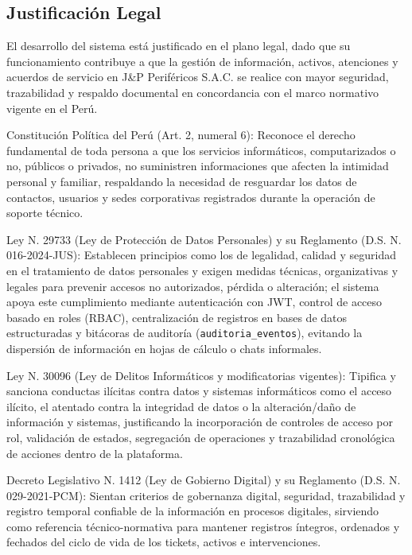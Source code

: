 \subsection{Justificación Legal}

El desarrollo del sistema está justificado en el plano legal, dado que su funcionamiento contribuye a que la gestión de información, activos, atenciones y acuerdos de servicio en J\&P Periféricos S.A.C. se realice con mayor seguridad, trazabilidad y respaldo documental en concordancia con el marco normativo vigente en el Perú.

Constitución Política del Perú (Art. 2, numeral 6): Reconoce el derecho fundamental de toda persona a que los servicios informáticos, computarizados o no, públicos o privados, no suministren informaciones que afecten la intimidad personal y familiar, respaldando la necesidad de resguardar los datos de contactos, usuarios y sedes corporativas registrados durante la operación de soporte técnico.

Ley N.\textdegree{} 29733 (Ley de Protección de Datos Personales) y su Reglamento (D.S. N.\textdegree{} 016-2024-JUS): Establecen principios como los de legalidad, calidad y seguridad en el tratamiento de datos personales y exigen medidas técnicas, organizativas y legales para prevenir accesos no autorizados, pérdida o alteración; el sistema apoya este cumplimiento mediante autenticación con JWT, control de acceso basado en roles (RBAC), centralización de registros en bases de datos estructuradas y bitácoras de auditoría (\texttt{auditoria\_eventos}), evitando la dispersión de información en hojas de cálculo o chats informales.

Ley N.\textdegree{} 30096 (Ley de Delitos Informáticos y modificatorias vigentes): Tipifica y sanciona conductas ilícitas contra datos y sistemas informáticos como el acceso ilícito, el atentado contra la integridad de datos o la alteración/daño de información y sistemas, justificando la incorporación de controles de acceso por rol, validación de estados, segregación de operaciones y trazabilidad cronológica de acciones dentro de la plataforma.

Decreto Legislativo N.\textdegree{} 1412 (Ley de Gobierno Digital) y su Reglamento (D.S. N.\textdegree{} 029-2021-PCM): Sientan criterios de gobernanza digital, seguridad, trazabilidad y registro temporal confiable de la información en procesos digitales, sirviendo como referencia técnico-normativa para mantener registros íntegros, ordenados y fechados del ciclo de vida de los tickets, activos e intervenciones.

